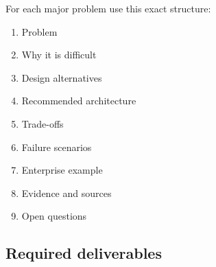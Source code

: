 For each major problem use this exact structure:\par

\begin{enumerate}

\item Problem

\item Why it is difficult

\item Design alternatives

\item Recommended architecture

\item Trade-offs

\item Failure scenarios

\item Enterprise example

\item Evidence and sources

\item Open questions

\end{enumerate}

\subsection{Required deliverables}

